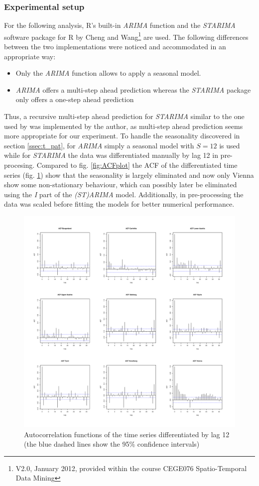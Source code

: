 \documentclass[a4paper,reqno,]{article}
\begin{document}
\subsubsection{Experimental setup}
For the following analysis, R's built-in \textit{ARIMA} function and the \textit{STARIMA} software package for R by Cheng and Wang\footnote{V2.0, January 2012, provided within the course CEGE076 Spatio-Temporal Data Mining} are used. The following differences between the two implementations were noticed and accommodated in an appropriate way:
\begin{itemize}
\item Only the \textit{ARIMA} function allows to apply a seasonal model.
\item \textit{ARIMA} offers a multi-step ahead prediction whereas the \textit{STARIMA} package only offers a one-step ahead prediction
\end{itemize}
Thus, a recursive multi-step ahead prediction for \textit{STARIMA} similar to the one used by \cite{liu2017svm} was implemented by the author, as multi-step ahead prediction seems more appropriate for our experiment.
To handle the seasonality discovered in section \ref{ssec:t_pat}, for \textit{ARIMA} simply a seasonal model with $S=12$ is used while for \textit{STARIMA} the data was differentiated manually by lag 12 in pre-procesing. Compared to fig. \ref{fig:ACFplot} the ACF of the differentiated time series (fig. \ref{fig:STARIMA_ACF_diff12}) show that the seasonality is largely eliminated and now only Vienna show some non-stationary behaviour, which can possibly later be eliminated using the \textit{I} part of the \textit{(ST)ARIMA} model. Additionally, in pre-processing the data was scaled before fitting the models for better numerical performance.
\begin{figure}[h!]
\centering
\includegraphics[width=1\textwidth]{images/ARIMA/STARIMA_ACF_stays_diff12.pdf}
\caption{Autocorrelation functions of the time series differentiated by lag 12 (the blue dashed lines show the 95\% confidence intervals)}
\label{fig:STARIMA_ACF_diff12}
\end{figure}
\end{document}
